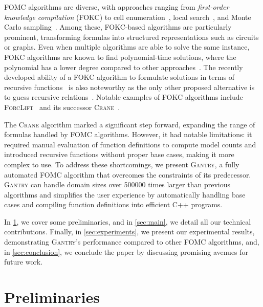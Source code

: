 \documentclass[a4paper,UKenglish,cleveref, autoref, thm-restate]{lipics-v2021}
\newcommand{\Cranetwo}{\textsc{Gantry}}
\begin{document}
FOMC algorithms are diverse, with approaches ranging from \emph{first-order
  knowledge compilation} (FOKC) to cell
enumeration~\cite{DBLP:conf/uai/BremenK21}, local
search~\cite{DBLP:journals/pvldb/NiuRDS11}, and Monte Carlo
sampling~\cite{DBLP:journals/cacm/GogateD16}. Among these, FOKC-based algorithms
are particularly prominent, transforming formulas into structured
representations such as circuits or graphs. Even when multiple algorithms are
able to solve the same instance, FOKC algorithms are known to find
polynomial-time solutions, where the polynomial has a lower degree compared to
other approaches~\cite{DBLP:conf/kr/DilkasB23}. The recently developed ability
of a FOKC algorithm to formulate solutions in terms of recursive
functions~\cite{DBLP:conf/kr/DilkasB23} is also noteworthy as the only other
proposed alternative is to guess recursive
relations~\cite{DBLP:conf/ilp/BarvinekB0ZK21}. Notable examples of FOKC
algorithms include \textsc{ForcLift}~\cite{DBLP:conf/ijcai/BroeckTMDR11} and its
successor \textsc{Crane}~\cite{DBLP:conf/kr/DilkasB23}.


The \textsc{Crane} algorithm marked a significant step forward, expanding the
range of formulas handled by FOMC algorithms. However, it had notable
limitations: it required manual evaluation of function definitions to compute
model counts and introduced recursive functions without proper base cases,
making it more complex to use. To address these shortcomings, we present
\Cranetwo{}, a fully automated FOMC algorithm that overcomes the constraints of
its predecessor. \Cranetwo{} can handle domain sizes over \num{500000} times
larger than previous algorithms and simplifies the user experience by
automatically handling base cases and compiling function definitions into
efficient C++ programs.

In \cref{sec:preliminaries}, we cover some preliminaries, and in
\cref{sec:main}, we detail all our technical contributions. Finally, in
\cref{sec:experiments}, we present our experimental results, demonstrating
\Cranetwo{}'s performance compared to other FOMC algorithms, and, in
\cref{sec:conclusion}, we conclude the paper by discussing promising avenues for
future work.

\section{Preliminaries}\label{sec:preliminaries}
\end{document}
